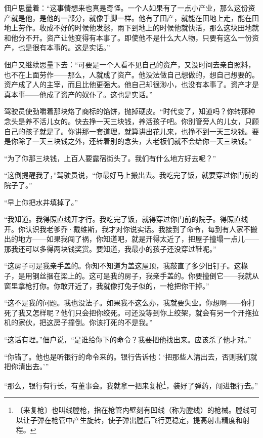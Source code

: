 \documentclass[12pt,UTF-8,openany]{ctexbook}
\begin{document}
    佃户思量着：“这事情想来也真是奇怪。一个人如果有了一点小产业，那么这份资产就是他，是他的一部分，就像手脚一样。他有了田产，就能在田地上走，能在田地上劳作。收成不好的时候他发愁，雨下到地上的时候他就快活，那么这块田地就和他分不开。资产让他变得有本事了。即使他不是什么大人物，只要有这么一份资产，也是很有本事的。这是实话。”
    
    佃户又继续思量下去：“可要是一个人看不见自己的资产，又没时间去亲自照料，也不在上面劳作——那么，人就成了资产。他没法做自己想做的，想自己想要的。资产成了人的主宰，而且比他更强大。他自己却很渺小，也没有本事了。资产才是真本事——他成了资产的奴仆了。这也是实话。”
    
    驾驶员使劲嚼着那块烙了商标的馅饼，抛掉硬皮。“时代变了，知道吗？你转那种念头是养不活儿女的。快去挣一天三块钱，养活孩子吧。你别管旁人的儿女，只顾自己的孩子就是了。你讲那一套道理，就算讲出花儿来，也挣不到一天三块钱。要是你除了一天三块钱之外，还转着别的念头，大老板们就不会给你一天三块钱。”
    
    “为了你那三块钱，上百人要露宿街头了。我们有什么地方好去呢？”
    
    “这倒提醒我了，”驾驶员说，“你最好马上搬出去。我吃完了饭，就要穿过你门前的院子了。”
    
    “早上你把水井填掉了。”
    
    “我知道。我得照直线开才行。我吃完了饭，就得穿过你门前的院子。得照直线开。你认识我老爹乔·戴维斯，我才对你说实话。我接到了命令，每到有人家不搬出的地方——如果我闯了祸，你知道吧，就是开得太近了，把屋子撞塌一点儿——那我还可以多得两块钱奖赏。要知道，我最小的孩子还没穿过鞋呢。”
    
    “这房子可是我亲手盖的。你知不知道为盖这屋顶，我敲直了多少旧钉子。这椽子，是用钢丝捆在梁上的。这可是我的房子，我亲手盖的。你要撞倒它——我就从窗里拿枪打你。你敢开近了，我就像打兔子似的，一枪把你干掉。”
    
    “这不是我的问题。我也没法子。如果我不这么办，我就要失业。你想啊——你打死了我又怎样呢？他们只会把你绞死。可还没等到你上绞架，就会有另一个开拖拉机的家伙，把这房子撞倒。你该打死的不是我。”
    
    “这话有理。”佃户说，“是谁给你下的命令？我要把他找出来。应该杀了他才对。”
    
    “你错了。他也是听银行的命令来的。银行告诉他：‘把那些人清出去，否则我们就把你清出去。’”
    
    “那么，银行有行长，有董事会。我就拿一把来复枪\footnote{〔来复枪〕也叫线膛枪，指在枪管内壁刻有凹线（称为膛线）的枪械。膛线可以让子弹在枪管中产生旋转，使子弹出膛后飞行更稳定，提高射击精度和射程。}，装好了弹药，闯进银行去。”
    
\end{document}
